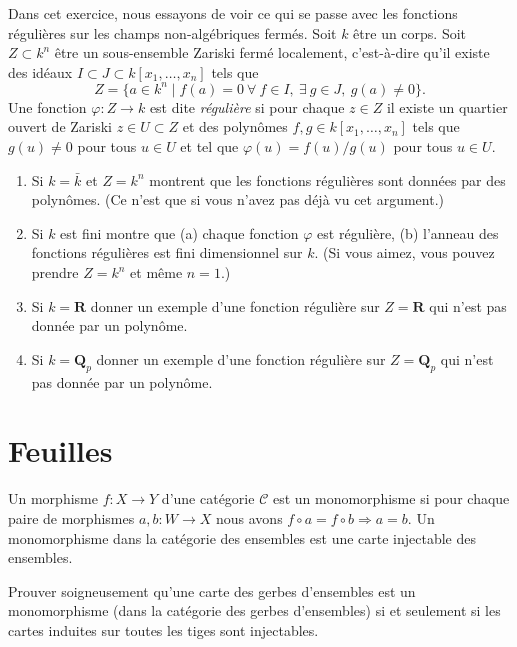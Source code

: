 \begin{exercise}
\label{exercise-regular-functions}
Dans cet exercice, nous essayons de voir ce qui se passe avec les
fonctions régulières sur les champs non-algébriques fermés. Soit $k$ être un
corps. Soit $Z \subset k^n$ être un sous-ensemble Zariski fermé localement, c'est-à-dire qu'il
existe des idéaux $I \subset J \subset k[x_1, \ldots, x_n]$ tels que
$$
Z = \{a \in k^n \mid
f(a) = 0\ \forall\ f \in I,\ \exists\ g \in J,\ g(a) \not = 0\}.
$$
Une fonction $\varphi : Z \to k$ est dite {\it régulière} si pour chaque $z
\in Z$ il existe un quartier ouvert de Zariski $z \in U \subset Z$ et
des polynômes $f, g \in k[x_1, \ldots, x_n]$ tels que $g(u)
\not = 0$ pour tous $u \in U$ et tel
que $\varphi(u) = f(u)/g(u)$ pour tous $u \in U$.
\begin{enumerate}
\item Si $k = \bar k$ et $Z = k^n$ montrent que les fonctions
régulières sont données par des polynômes. (Ce n'est que si vous n'avez pas déjà vu
cet argument.)
\item Si $k$ est fini montre que (a) chaque fonction $\varphi$ est régulière, (b)
l'anneau des fonctions régulières est fini dimensionnel sur $k$. (Si vous aimez, vous
pouvez prendre $Z = k^n$ et même $n = 1$.)
\item Si $k = \mathbf{R}$ donner un exemple d'une fonction régulière sur
$Z = \mathbf{R}$ qui n'est pas donnée par un polynôme.
\item Si $k = \mathbf{Q}_p$ donner un exemple d'une fonction régulière sur
$Z = \mathbf{Q}_p$ qui n'est pas donnée par un polynôme.
\end{enumerate}
\end{exercise}






\section{Feuilles}
\label{section-sheaves}

\noindent
Un morphisme $f : X \to Y$ d'une catégorie $\mathcal{C}$ est un monomorphisme {\it} si pour chaque
paire de morphismes $a, b : W \to X$ nous avons
$f \circ a = f \circ b \Rightarrow a = b$. Un monomorphisme dans la catégorie
des ensembles est une carte injectable des ensembles.

\begin{exercise}
\label{exercise-mono-sheaves-sets}
Prouver soigneusement qu'une carte des gerbes d'ensembles est un monomorphisme (dans
la catégorie des gerbes d'ensembles) si et seulement si les cartes induites sur
toutes les tiges sont injectables.
\end{exercise}

